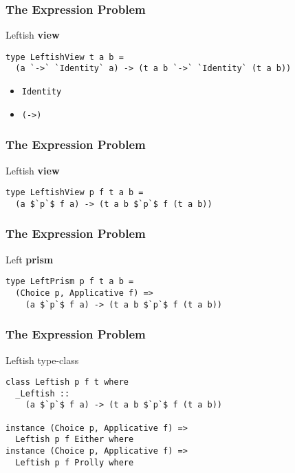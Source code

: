 \begin{frame}[fragile]
\frametitle{The Expression Problem}
\begin{block}{Leftish \textbf{view}}
\begin{lstlisting}[style=haskell,mathescape]
type LeftishView t a b =
  (a `->` `Identity` a) -> (t a b `->` `Identity` (t a b))
\end{lstlisting}
\end{block}
\begin{itemize}
\item<1-> \lstinline[style=haskell]{Identity}
\item<2-> \lstinline[style=haskell]{(->)}
\end{itemize}
\end{frame}

\begin{frame}[fragile]
\frametitle{The Expression Problem}
\begin{block}{Leftish \textbf{view}}
\begin{lstlisting}[style=haskell,mathescape]
type LeftishView p f t a b =
  (a $`p`$ f a) -> (t a b $`p`$ f (t a b))
\end{lstlisting}
\end{block}
\end{frame}

\begin{frame}[fragile]
\frametitle{The Expression Problem}
\begin{block}{Left \textbf{prism}}
\begin{lstlisting}[style=haskell,mathescape]
type LeftPrism p f t a b =
  (Choice p, Applicative f) => 
    (a $`p`$ f a) -> (t a b $`p`$ f (t a b))
\end{lstlisting}
\end{block}
\end{frame}

\begin{frame}[fragile]
\frametitle{The Expression Problem}
\begin{block}{Leftish type-class}
\begin{lstlisting}[style=haskell,mathescape]
class Leftish p f t where
  _Leftish ::
    (a $`p`$ f a) -> (t a b $`p`$ f (t a b))

instance (Choice p, Applicative f) =>
  Leftish p f Either where
instance (Choice p, Applicative f) =>
  Leftish p f Prolly where
\end{lstlisting}
\end{block}
\end{frame}

